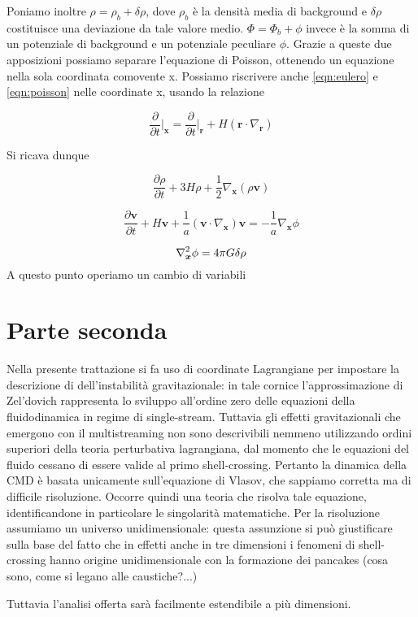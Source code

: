 Poniamo inoltre $\rho = \rho_b + \delta\rho$, dove $\rho_b$ è la densità media di background
e $\delta\rho$ costituisce una deviazione da tale valore medio. $\Phi = \Phi_b + \phi$ invece
è la somma di un potenziale di background e un potenziale peculiare $\phi$. Grazie a queste due 
apposizioni possiamo separare l'equazione di Poisson, ottenendo un equazione nella sola coordinata
comovente x.
Possiamo riscrivere anche \ref{eqn:eulero} e \ref{eqn:poisson} nelle coordinate x, usando la
relazione

\begin{equation}
    \frac{\partial}{\partial t}\biggr|_{\bm{x}} = \frac{\partial}{\partial t}\biggr|_{\bm{r}} + H(\bm{r} \cdot \nabla_{\bm{r}})
\end{equation}

Si ricava dunque

\begin{equation}
    \frac{\partial\rho}{\partial t} + 3H\rho +\frac{1}{2}\nabla_{\bm{x}}(\rho\bm{v})
\end{equation}

\begin{equation}
    \frac{\partial \bm{v}}{\partial t} + H \bm{v} + \frac{1}{a}(\bm{v}\cdot\nabla_{\bm{x}})\bm{v} = -\frac{1}{a}\nabla_{\bm{x}}\phi
\end{equation}

\begin{equation}
    \label{eqn:poissonx}
    \laplacian_{\bm{x}}\phi = 4\pi G \delta\rho
\end{equation}
A questo punto operiamo un cambio di variabili

\section{Parte seconda}

Nella presente trattazione si fa uso di coordinate Lagrangiane per impostare la descrizione di dell'instabilità
gravitazionale: in tale cornice l'approssimazione di Zel'dovich rappresenta lo sviluppo all'ordine zero delle
equazioni della fluidodinamica in regime di single-stream.
Tuttavia gli effetti gravitazionali che emergono con il multistreaming non sono descrivibili nemmeno utilizzando
ordini superiori della teoria perturbativa lagrangiana, dal momento che le equazioni del fluido cessano di essere
valide al primo shell-crossing. Pertanto la dinamica della CMD è basata unicamente sull'equazione di Vlasov, che 
sappiamo corretta ma di difficile risoluzione. Occorre quindi una teoria che risolva tale equazione, identificandone
in particolare le singolarità matematiche. Per la risoluzione assumiamo un universo unidimensionale: questa assunzione
si può giustificare sulla base del fatto che in effetti anche in tre dimensioni i fenomeni di shell-crossing hanno 
origine unidimensionale con la formazione dei pancakes (cosa sono, come si legano alle caustiche?...)

Tuttavia l'analisi offerta sarà facilmente estendibile a più dimensioni.



